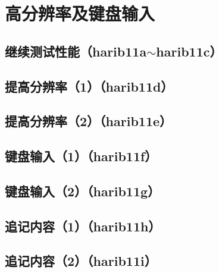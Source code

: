 ﻿\chapter{	高分辨率及键盘输入	}
\section{	继续测试性能（harib11a$\sim$harib11c）	}
\section{	提高分辨率（1）（harib11d）	}
\section{	提高分辨率（2）（harib11e）	}
\section{	键盘输入（1）（harib11f）	}
\section{	键盘输入（2）（harib11g）	}
\section{	追记内容（1）（harib11h）	}
\section{	追记内容（2）（harib11i）	}


